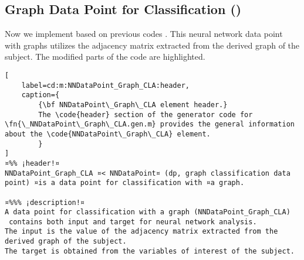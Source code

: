 \documentclass{tufte-handout}
\begin{document}
\clearpage
\subsection{Graph Data Point for Classification ()}

Now we implement  based on previous codes .
This neural network data point with graphs utilizes the adjacency matrix extracted from the derived graph of the subject. 
The modified parts of the code are highlighted.

\begin{lstlisting}[
	label=cd:m:NNDataPoint_Graph_CLA:header,
	caption={
		{\bf NNDataPoint\_Graph\_CLA element header.}
		The \code{header} section of the generator code for \fn{\_NNDataPoint\_Graph\_CLA.gen.m} provides the general information about the \code{NNDataPoint\_Graph\_CLA} element.
		}
]
¤%% ¡header!¤
NNDataPoint_Graph_CLA ¤< NNDataPoint¤ (dp, graph classification data point) ¤is a data point for classification with ¤a graph.

¤%%% ¡description!¤
A data point for classification with a graph (NNDataPoint_Graph_CLA) 
 contains both input and target for neural network analysis.
The input is the value of the adjacency matrix extracted from the derived graph of the subject.
The target is obtained from the variables of interest of the subject.
\end{lstlisting}
\end{document}
